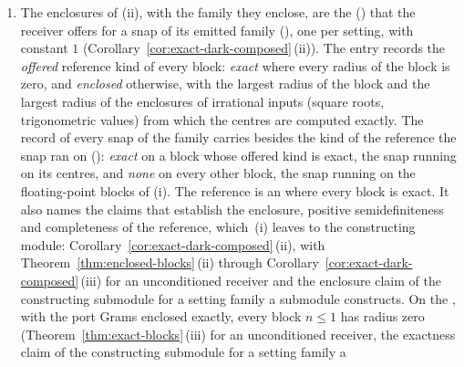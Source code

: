 \begin{requirement}
\begin{enumerate}[label=(\roman*),leftmargin=2.4em]
\begin{enumerate}[label=(\alph*),leftmargin=2.0em]
    per-port dark-count probabilities; or, for $S=\varnothing$ and $n\ge1$, by
    Proposition~\ref{prop:noise-floor}\,(iv) at a setting whose operator
    $B^{(t)}$ the engine has computed in exact arithmetic and found to be the
    identity, which for the unconditioned receiver is $A_\Sigma$ computed
    from the port Grams of
    Requirement~\ref{req:exact-route-decision}\,(i) or (ii);
  \item every entry whose enclosure is exact by
    Theorem~\ref{thm:exact-blocks}\,(ii) or by the exactness of its blocks
    that a submodule constructing the setting family states, carried through
    Corollary~\ref{cor:exact-dark-composed}\,(i), and whose value is zero.
  \end{enumerate}
  No other entry is required to be enclosed as zero.
\item The enclosures of (ii), with the family they enclose, are the
   () that the receiver
  offers for a snap of its emitted family
  (), one per setting, with constant $1$
  (Corollary~\ref{cor:exact-dark-composed}\,(ii)). The entry records the
  \emph{offered} reference kind of every block: \emph{exact} where every
  radius of the block is zero, and \emph{enclosed} otherwise, with the
  largest radius of the block and the largest radius of the enclosures of
  irrational inputs (square roots, trigonometric values) from which the
  centres are computed exactly. The record of every snap of the family
  carries besides the kind of the reference the snap ran on
  (): \emph{exact} on a block whose
  offered kind is exact, the snap running on its centres, and \emph{none}
  on every other block, the snap running on the floating-point blocks of
  (i). The reference is an
   where every block is exact. It also names the claims that establish the
  enclosure, positive semidefiniteness and completeness of the reference,
  which \,(i) leaves to the
  constructing module: Corollary~\ref{cor:exact-dark-composed}\,(ii), with
  Theorem~\ref{thm:enclosed-blocks}\,(ii) through
  Corollary~\ref{cor:exact-dark-composed}\,(iii) for an unconditioned
  receiver and the enclosure claim of the constructing submodule for a
  setting family a submodule constructs. On the , with the
  port Grams enclosed exactly, every block $n\le1$ has radius zero
  (Theorem~\ref{thm:exact-blocks}\,(iii) for an unconditioned receiver, the
  exactness claim of the constructing submodule for a setting family a

\end{enumerate}
\end{requirement}
